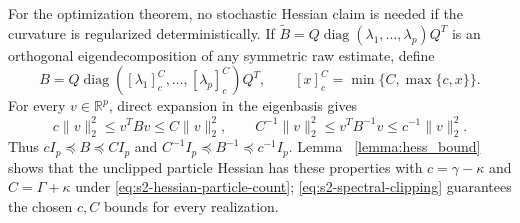 \documentclass[11pt]{article}
\theoremstyle{thmstylethree}%
\begin{document}
For the optimization theorem, no stochastic Hessian claim is needed if the
curvature is regularized deterministically.  If
$\widetilde B=Q\operatorname{diag}(\lambda_1,\ldots,\lambda_p)Q^T$ is an
orthogonal eigendecomposition of any symmetric raw estimate, define
\begin{equation}
B=Q\operatorname{diag}([\lambda_1]_c^C,\ldots,[\lambda_p]_c^C)Q^T,
\qquad [x]_c^C=\min\{C,\max\{c,x\}\}.                          \label{eq:s2-spectral-clipping}
\end{equation}
For every $v\in\mathbb R^p$, direct expansion in the eigenbasis gives
\begin{equation}
c\|v\|_2^2\leq v^TBv\leq C\|v\|_2^2,
\qquad
C^{-1}\|v\|_2^2\leq v^TB^{-1}v\leq c^{-1}\|v\|_2^2.         \label{eq:s2-preconditioner-bounds}
\end{equation}
Thus $cI_p\preceq B\preceq CI_p$ and
$C^{-1}I_p\preceq B^{-1}\preceq c^{-1}I_p$.  Lemma~
\ref{lemma:hess_bound} shows that the unclipped particle Hessian has these
properties with $c=\gamma-\kappa$ and $C=\Gamma+\kappa$ under
\eqref{eq:s2-hessian-particle-count}; \eqref{eq:s2-spectral-clipping}
guarantees the chosen $c,C$ bounds for every realization.
\end{document}
